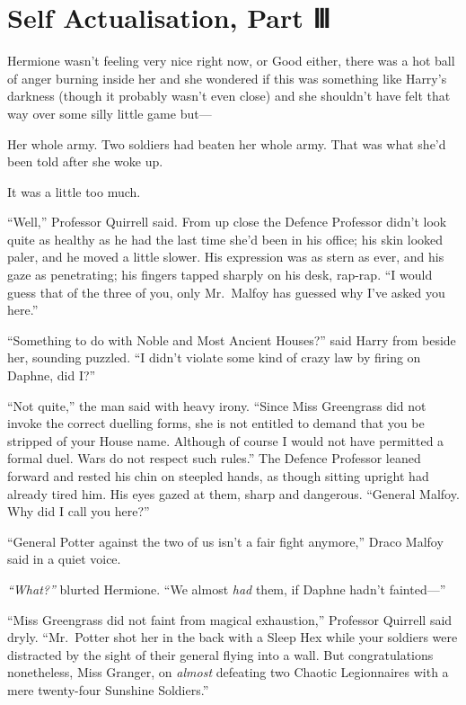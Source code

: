 \chapter{Self Actualisation, Part Ⅲ}\label{self-actualisation-part}

Hermione wasn't feeling very nice right now, or Good either, there was a
hot ball of anger burning inside her and she wondered if this was
something like Harry's darkness (though it probably wasn't even close)
and she shouldn't have felt that way over some silly little game but---

Her whole army. Two soldiers had beaten her whole army. That was what
she'd been told after she woke up.

It was a little too much.

``Well,'' Professor Quirrell said. From up close the Defence Professor
didn't look quite as healthy as he had the last time she'd been in his
office; his skin looked paler, and he moved a little slower. His
expression was as stern as ever, and his gaze as penetrating; his
fingers tapped sharply on his desk, rap-rap. ``I would guess that of the
three of you, only Mr.~Malfoy has guessed why I've asked you here.''

``Something to do with Noble and Most Ancient Houses?'' said Harry from
beside her, sounding puzzled. ``I didn't violate some kind of crazy law
by firing on Daphne, did I?''

``Not quite,'' the man said with heavy irony. ``Since Miss Greengrass
did not invoke the correct duelling forms, she is not entitled to demand
that you be stripped of your House name. Although of course I would not
have permitted a formal duel. Wars do not respect such rules.'' The
Defence Professor leaned forward and rested his chin on steepled hands,
as though sitting upright had already tired him. His eyes gazed at them,
sharp and dangerous. ``General Malfoy. Why did I call you here?''

``General Potter against the two of us isn't a fair fight anymore,''
Draco Malfoy said in a quiet voice.

\emph{``What?''} blurted Hermione. ``We almost \emph{had} them, if
Daphne hadn't fainted---''

``Miss Greengrass did not faint from magical exhaustion,'' Professor
Quirrell said dryly. ``Mr.~Potter shot her in the back with a Sleep Hex
while your soldiers were distracted by the sight of their general flying
into a wall. But congratulations nonetheless, Miss Granger, on
\emph{almost} defeating two Chaotic Legionnaires with a mere twenty-four
Sunshine Soldiers.''


